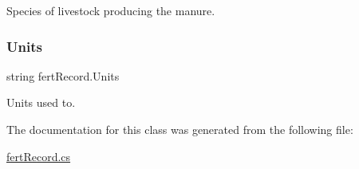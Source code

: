 Species of livestock producing the manure. \mbox{\label{classfert_record_a9a4acd1daa3940bca690a0dd8a939cdb}} 
\subsubsection{\texorpdfstring{Units}{Units}}
{\footnotesize\ttfamily string fert\+Record.\+Units}

Units used to. 

The documentation for this class was generated from the following file\+:\begin{DoxyCompactItemize}
\item 
\mbox{\hyperlink{fert_record_8cs}{fert\+Record.\+cs}}\end{DoxyCompactItemize}
